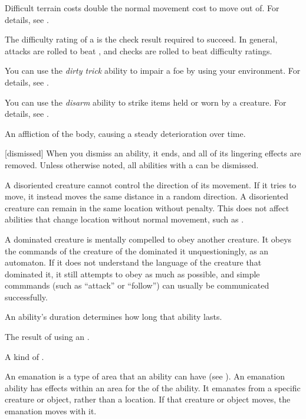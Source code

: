  Difficult terrain costs double the normal movement cost to move out of.
For details, see .

 The difficulty rating of a  is the check result required to succeed.
In general, attacks are rolled to beat , and checks are rolled to beat difficulty ratings.

 You can use the \textit{dirty trick} ability to impair a foe by using your environment.
For details, see .

 You can use the \textit{disarm} ability to strike items held or worn by a creature.
For details, see .

 An affliction of the body, causing a steady deterioration over time.

[dismissed] When you dismiss an ability, it ends, and all of its lingering effects are removed.
Unless otherwise noted, all abilities with a  can be dismissed.

 A disoriented creature cannot control the direction of its movement.
If it tries to move, it instead moves the same distance in a random direction.
A disoriented creature can remain in the same location without penalty.
This does not affect abilities that change location without normal movement, such as .

 A dominated creature is mentally compelled to obey another creature.
It obeys the commands of the creature of the dominated it unquestioningly, as an automaton.
If it does not understand the language of the creature that dominated it, it still attempts to obey as much as possible, and simple commmands (such as ``attack'' or ``follow'') can usually be communicated successfully.

 An ability's duration determines how long that ability lasts.

 The result of using an .

 A kind of .

 An emanation is a type of area that an ability can have (see ).
An emanation ability has effects within an area for the  of the ability.
It emanates from a specific creature or object, rather than a location.
If that creature or object moves, the emanation moves with it.

